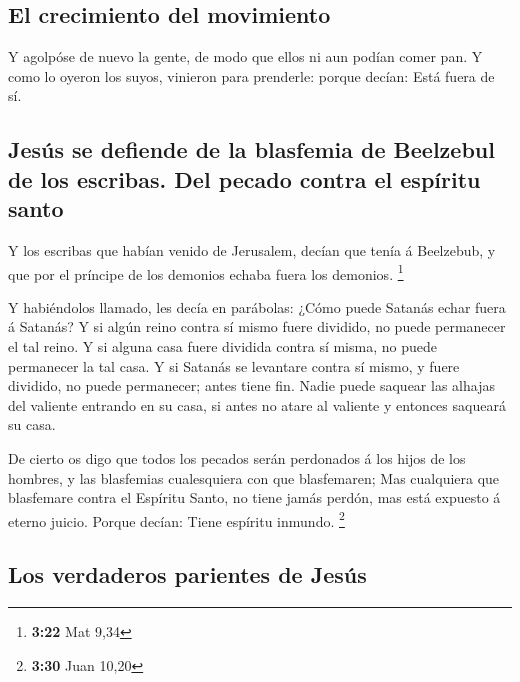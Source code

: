 \hypertarget{el-crecimiento-del-movimiento}{%
\subsection{El crecimiento del
movimiento}\label{el-crecimiento-del-movimiento}}

 Y agolpóse de nuevo la gente, de modo que ellos ni aun
podían comer pan.  Y como lo oyeron los suyos, vinieron
para prenderle: porque decían: Está fuera de sí.

\hypertarget{jesuxfas-se-defiende-de-la-blasfemia-de-beelzebul-de-los-escribas.-del-pecado-contra-el-espuxedritu-santo}{%
\subsection{Jesús se defiende de la blasfemia de Beelzebul de los
escribas. Del pecado contra el espíritu
santo}\label{jesuxfas-se-defiende-de-la-blasfemia-de-beelzebul-de-los-escribas.-del-pecado-contra-el-espuxedritu-santo}}

 Y los escribas que habían venido de Jerusalem, decían que
tenía á Beelzebub, y que por el príncipe de los demonios echaba fuera
los demonios. \footnote{\textbf{3:22} Mat 9,34}

 Y habiéndolos llamado, les decía en parábolas: ¿Cómo puede
Satanás echar fuera á Satanás?  Y si algún reino contra sí
mismo fuere dividido, no puede permanecer el tal reino.  Y
si alguna casa fuere dividida contra sí misma, no puede permanecer la
tal casa.  Y si Satanás se levantare contra sí mismo, y
fuere dividido, no puede permanecer; antes tiene fin. 
Nadie puede saquear las alhajas del valiente entrando en su casa, si
antes no atare al valiente y entonces saqueará su casa.

 De cierto os digo que todos los pecados serán perdonados á
los hijos de los hombres, y las blasfemias cualesquiera con que
blasfemaren;  Mas cualquiera que blasfemare contra el
Espíritu Santo, no tiene jamás perdón, mas está expuesto á eterno
juicio.  Porque decían: Tiene espíritu inmundo. \footnote{\textbf{3:30}
  Juan 10,20}

\hypertarget{los-verdaderos-parientes-de-jesuxfas}{%
\subsection{Los verdaderos parientes de
Jesús}\label{los-verdaderos-parientes-de-jesuxfas}}

